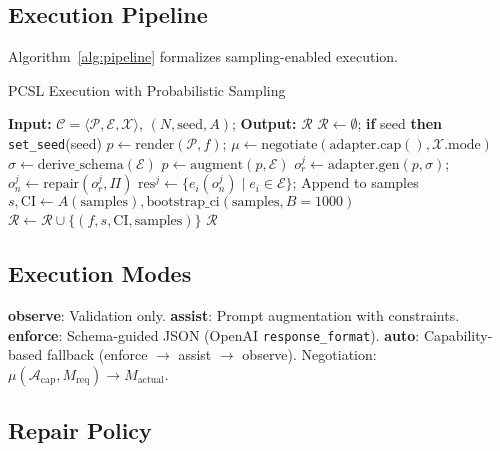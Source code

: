 \documentclass[sigconf]{acmart}
\begin{document}
\subsection{Execution Pipeline}

Algorithm~\ref{alg:pipeline} formalizes sampling-enabled execution.

\begin{algorithm}[t]
\caption{PCSL Execution with Probabilistic Sampling}
\label{alg:pipeline}
\scriptsize
\begin{algorithmic}[1]
\STATE \textbf{Input:} \( \mathcal{C} = \langle \mathcal{P}, \mathcal{E}, \mathcal{X} \rangle \), \( (N, \text{seed}, A) \); \textbf{Output:} \( \mathcal{R} \)
\STATE \( \mathcal{R} \leftarrow \emptyset \); \textbf{if} seed \textbf{then} \texttt{set\_seed}(seed)
  \STATE \( p \leftarrow \text{render}(\mathcal{P}, f) \); \( \mu \leftarrow \text{negotiate}(\text{adapter.cap}(), \mathcal{X}.\text{mode}) \)
   \STATE \( \sigma \leftarrow \text{derive\_schema}(\mathcal{E}) \) \ENDIF
   \STATE \( p \leftarrow \text{augment}(p, \mathcal{E}) \) \ENDIF
    \STATE \( o_r^j \leftarrow \text{adapter.gen}(p, \sigma) \); \( o_n^j \leftarrow \text{repair}(o_r^j, \Pi) \)
    \STATE \( \text{res}^j \leftarrow \{e_i(o_n^j) \mid e_i \in \mathcal{E}\} \); Append to samples
  \ENDFOR
  \STATE \( s, \text{CI} \leftarrow A(\text{samples}), \text{bootstrap\_ci}(\text{samples}, B=1000) \)
  \STATE \( \mathcal{R} \leftarrow \mathcal{R} \cup \{(f, s, \text{CI}, \text{samples})\} \)
\ENDFOR
\RETURN \( \mathcal{R} \)
\end{algorithmic}
\end{algorithm}

\subsection{Execution Modes}

\textbf{observe}: Validation only. \textbf{assist}: Prompt augmentation with constraints. \textbf{enforce}: Schema-guided JSON (OpenAI \texttt{response\_format}). \textbf{auto}: Capability-based fallback (enforce \(\to\) assist \(\to\) observe). Negotiation: \( \mu(\mathcal{A}_{\text{cap}}, M_{\text{req}}) \to M_{\text{actual}} \).

\subsection{Repair Policy}
\end{document}
